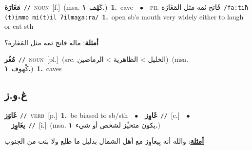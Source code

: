 \documentclass[10pt,a4paper,twoside]{article} %
\begin{document}
\begin{multicols}{2}
{\setlength\topsep{0pt}\textbf{\foreignlanguage{arabic}{مَغَارَة}}\ {\color{gray}\texttt{//}\color{black}}\ \textsc{noun}\ [f.]\ \color{gray}(msa. \foreignlanguage{arabic}{كَهْف}~\foreignlanguage{arabic}{\textbf{١.}})\color{black}\ \textbf{1.}~cave\ \ $\bullet$\ \ \textsc{ph.} \color{gray} \foreignlanguage{arabic}{فَاتح ثمه مثل المَغَارَة}\color{black}\ {\color{gray}\texttt{/{\sffamily faːtiħ (t)immo mi(t)il ʔilmaɣaːra}/}\color{black}}\ \textbf{1.}~open sb's mouth very widely either to laugh or eat sth\  \begin{flushright}\color{gray}\foreignlanguage{arabic}{\textbf{\underline{\foreignlanguage{arabic}{أمثلة}}}: ماله فاتح ثمه مثل المَغارة؟}\end{flushright}\color{black}} \vspace{2mm}

{\setlength\topsep{0pt}\textbf{\foreignlanguage{arabic}{مُغُر}}\ {\color{gray}\texttt{//}\color{black}}\ \textsc{noun}\ [pl.]\ (src. \color{gray}\foreignlanguage{arabic}{الخليل > الظاهرية > الرماضين}\color{black})\ \color{gray}(msa. \foreignlanguage{arabic}{كْهوف}~\foreignlanguage{arabic}{\textbf{١.}})\color{black}\ \textbf{1.}~caves\ } \vspace{2mm}

\vspace{-3mm}
\subsection*{\color{blue}\foreignlanguage{arabic}{غ.و.ز}\color{blue}{}} 

{\setlength\topsep{0pt}\textbf{\foreignlanguage{arabic}{غَاوَز}}\ {\color{gray}\texttt{//}\color{black}}\ \textsc{verb}\ [p.]\ \textbf{1.}~be biased to sb/sth\ \ $\bullet$\ \ \setlength\topsep{0pt}\textbf{\foreignlanguage{arabic}{غَاوِز}}\ {\color{gray}\texttt{//}\color{black}}\ [c.]\ \ $\bullet$\ \ \setlength\topsep{0pt}\textbf{\foreignlanguage{arabic}{يغَاوِز}}\ {\color{gray}\texttt{//}\color{black}}\ [i.]\ \color{gray}(msa. \foreignlanguage{arabic}{يكون متحيِّز لشخص أو شيء}~\foreignlanguage{arabic}{\textbf{١.}})\color{black}\  \begin{flushright}\color{gray}\foreignlanguage{arabic}{\textbf{\underline{\foreignlanguage{arabic}{أمثلة}}}: والله أنه بِيغاَوِز مع أهل الشمال بدليل ما طلع ولا بنت من الجنوب}\end{flushright}\color{black}} \vspace{2mm}


\end{multicols}
\end{document}
